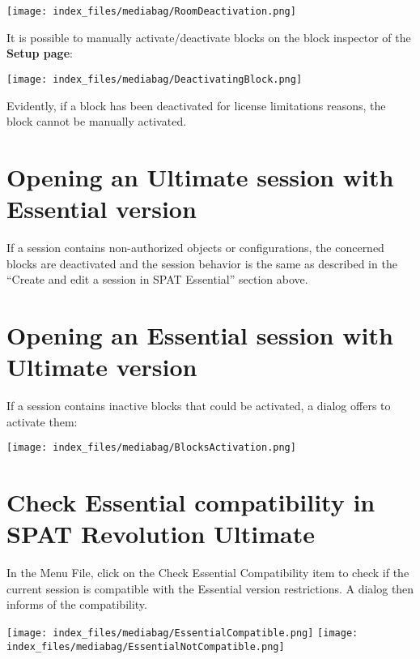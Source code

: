 \documentclass[
  letterpaper,
  DIV=11,
  numbers=noendperiod]{scrreport}
\begin{document}
\texttt{[image: index\_files/mediabag/RoomDeactivation.png]}

It is possible to manually activate/deactivate blocks on the block
inspector of the \textbf{Setup page}:

\texttt{[image: index\_files/mediabag/DeactivatingBlock.png]}

Evidently, if a block has been deactivated for license limitations
reasons, the block cannot be manually activated.

\hypertarget{opening-an-ultimate-session-with-essential-version}{%
\section{Opening an Ultimate session with Essential
version}\label{opening-an-ultimate-session-with-essential-version}}

If a session contains non-authorized objects or configurations, the
concerned blocks are deactivated and the session behavior is the same as
described in the ``Create and edit a session in SPAT Essential'' section
above.

\hypertarget{opening-an-essential-session-with-ultimate-version}{%
\section{Opening an Essential session with Ultimate
version}\label{opening-an-essential-session-with-ultimate-version}}

If a session contains inactive blocks that could be activated, a dialog
offers to activate them:

\texttt{[image: index\_files/mediabag/BlocksActivation.png]}

\hypertarget{check-essential-compatibility-in-spat-revolution-ultimate}{%
\section{Check Essential compatibility in SPAT Revolution
Ultimate}\label{check-essential-compatibility-in-spat-revolution-ultimate}}

In the Menu File, click on the Check Essential Compatibility item to
check if the current session is compatible with the Essential version
restrictions. A dialog then informs of the compatibility.

\texttt{[image: index\_files/mediabag/EssentialCompatible.png]}
\texttt{[image: index\_files/mediabag/EssentialNotCompatible.png]}
\end{document}
